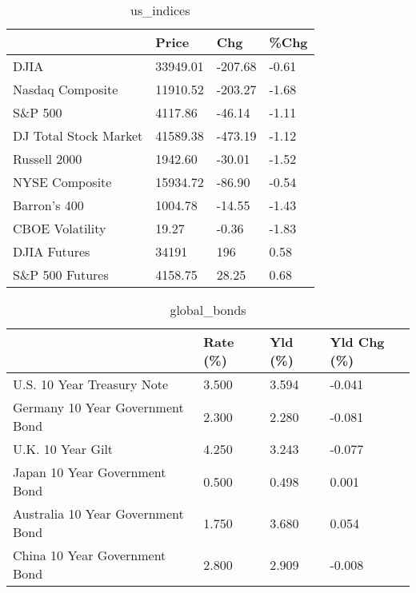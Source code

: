 \documentclass{article}%
\begin{document}
%


\begin{table}[htbp]%
\caption{us\_indices}%
\centering%
\begin{adjustbox}{width=1\textwidth}%
\begin{tabular}{llll}
\toprule
                      &    Price &     Chg &  \%Chg \\
\midrule
                 DJIA & 33949.01 & -207.68 & -0.61 \\
     Nasdaq Composite & 11910.52 & -203.27 & -1.68 \\
              S\&P 500 &  4117.86 &  -46.14 & -1.11 \\
DJ Total Stock Market & 41589.38 & -473.19 & -1.12 \\
         Russell 2000 &  1942.60 &  -30.01 & -1.52 \\
       NYSE Composite & 15934.72 &  -86.90 & -0.54 \\
         Barron's 400 &  1004.78 &  -14.55 & -1.43 \\
      CBOE Volatility &    19.27 &   -0.36 & -1.83 \\
         DJIA Futures &    34191 &     196 &  0.58 \\
      S\&P 500 Futures &  4158.75 &   28.25 &  0.68 \\
\bottomrule
\end{tabular}
%
\end{adjustbox}%
\end{table}

%


\begin{table}[htbp]%
\caption{global\_bonds}%
\centering%
\begin{adjustbox}{width=1\textwidth}%
\begin{tabular}{llll}
\toprule
                                  & Rate (\%) & Yld (\%) & Yld Chg (\%) \\
\midrule
       U.S. 10 Year Treasury Note &    3.500 &   3.594 &      -0.041 \\
  Germany 10 Year Government Bond &    2.300 &   2.280 &      -0.081 \\
                U.K. 10 Year Gilt &    4.250 &   3.243 &      -0.077 \\
    Japan 10 Year Government Bond &    0.500 &   0.498 &       0.001 \\
Australia 10 Year Government Bond &    1.750 &   3.680 &       0.054 \\
    China 10 Year Government Bond &    2.800 &   2.909 &      -0.008 \\
\bottomrule
\end{tabular}
%
\end{adjustbox}%
\end{table}
\end{document}
